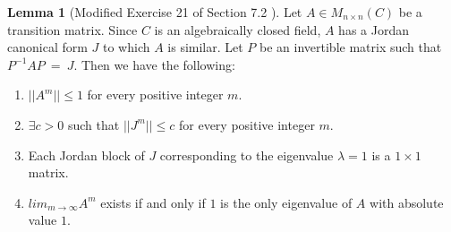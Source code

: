 \documentclass{amsart}
\theoremstyle{definition}
\newtheorem{lemma}[theorem]{Lemma}
\theoremstyle{remark}
\numberwithin{equation}{section}
\begin{document}
\begin{lemma}[Modified Exercise 21 of Section 7.2 \cite{friedberg2003linear}]
	Let $A \in M_{n \times n}(C)$ be a transition matrix.
	Since $C$ is an algebraically closed field, $A$ has a Jordan canonical form $J$ to which $A$ is similar.
	Let $P$ be an invertible matrix such that $P^{-1}AP\ =\ J$.
	Then we have the following:

	\begin{enumerate}
		
		\item $||A^m|| \leq 1$ for every positive integer $m$.
		\item $\exists c > 0$ such that $||J^m|| \leq c$ for every positive integer $m$.
		\item Each Jordan block of $J$ corresponding to the eigenvalue $\lambda = 1$ is a $1 \times 1$ matrix.
		\item $lim_{m \to \infty}A^m$ exists if and only if $1$ is the only eigenvalue of $A$ with absolute value $1$.

	\end{enumerate}


\end{lemma}
\end{document}
